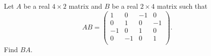 Let $A$ be a real $4\times 2$ matrix and $B$ be a real $2\times 4$ matrix such that
\[ AB = \left(%
\begin{array}{cccc}
  1 & 0 & -1 & 0 \\
  0 & 1 & 0 & -1 \\
  -1 & 0 & 1 & 0 \\
  0 & -1 & 0 & 1 \\
\end{array}%
\right). \]
Find $BA$.
